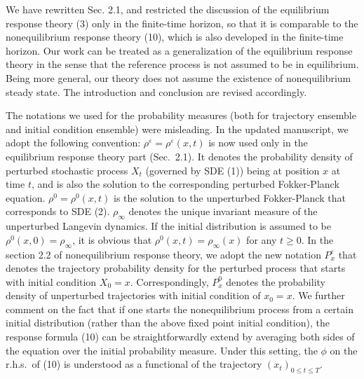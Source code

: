 \documentclass[]{revtex4-1}
\begin{document}
We have rewritten Sec. 2.1, and restricted the discussion of the
equilibrium response theory (3) only in the finite-time
horizon, so that it is comparable to the nonequilibrium response theory (10), which is also
developed in the finite-time horizon. Our work
can be treated as a
generalization of the equilibrium response theory in the sense that the
reference process is not assumed to be in equilibrium.
Being more general, our theory does not assume the existence of nonequilibrium steady state.
The introduction and conclusion are revised accordingly.

The notations we used for the probability measures (both for
trajectory ensemble and initial condition ensemble) were misleading.
In the updated manuscript, we adopt the following convention:
$\rho^\varepsilon = \rho^\varepsilon(x,t)$ is now used only in the equilibrium
response theory part (Sec.~2.1). It denotes the probability density of
perturbed stochastic process $X_t$ (governed by SDE (1))
being at position $x$ at time $t$,
and is also the solution to the corresponding perturbed Fokker-Planck
equation. 
$\rho^0 = \rho^0(x, t)$
is the solution to the unperturbed Fokker-Planck that corresponds
to SDE (2). $\rho_\infty$ denotes the unique invariant measure of the
unperturbed Langevin dynamics.
If the initial distribution is assumed to be
$\rho^0(x, 0) = \rho_\infty$, it is obvious
that $\rho^0(x, t) = \rho_\infty(x)$ for any $t\geq 0$.
In the section 2.2 of nonequilibrium response theory, we adopt the new notation
$P_x^\varepsilon$ that denotes the trajectory probability density for the
perturbed process that starts with initial condition $X_0 = x$.
Correspondingly, $P_x^0$ denotes the probability density of
unperturbed trajectories with initial condition of $x_0 = x$.
We further
comment on the fact that if one starts the nonequilibrium process 
from a certain initial distribution (rather than the above fixed point
initial condition),
the response formula (10) can
be straightforwardly extend by averaging both sides of the equation over
the initial probability measure.
Under this setting, the $\phi$ on the r.h.s.~of (10) is understood
as a functional of the trajectory $(x_t)_{0\leq t\leq T}$. 
\\
\end{document}
